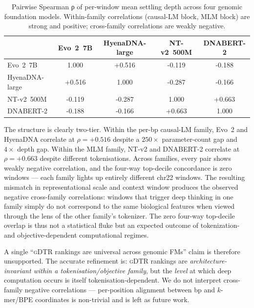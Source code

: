 \documentclass[12pt]{article}
\renewenvironment{table*}{\begin{table}}{\end{table}}
\theoremstyle{plain}
\theoremstyle{definition}
\theoremstyle{remark}
\newcommand{\gDTR}{\textsc{gDTR}}
\begin{document}
\begin{table}[t]
\caption{Pairwise Spearman ρ of per-window mean settling depth
across four genomic foundation models. Within-family correlations
(causal-LM block, MLM block) are strong and positive; cross-family
correlations are weakly negative.}
\label{tab:cross-arch}
\centering
\small
\begin{tabular}{@{}lcccc@{}}
\toprule
 & Evo~2~7B & HyenaDNA-large & NT-v2~500M & DNABERT-2 \\
\midrule
Evo~2~7B         & 1.000 & +0.516 & -0.119 & -0.188 \\
HyenaDNA-large   & +0.516 & 1.000 & -0.287 & -0.166 \\
NT-v2~500M       & -0.119 & -0.287 & 1.000 & +0.663 \\
DNABERT-2        & -0.188 & -0.166 & +0.663 & 1.000 \\
\bottomrule
\end{tabular}
\end{table}

The structure is clearly two-tier. Within the per-bp causal-LM family,
Evo~2 and HyenaDNA correlate at $\rho=+0.516$ despite a $250\times$
parameter-count gap and $4\times$ depth gap. Within the MLM family,
NT-v2 and DNABERT-2 correlate at $\rho=+0.663$ despite different
tokenisations. Across families, every pair shows weakly negative
correlation, and the four-way top-decile concordance is zero windows
--- each family lights up entirely different chr22 windows. The
resulting mismatch in representational scale and context window
produces the observed negative cross-family correlations: windows that
trigger deep thinking in one family simply do not correspond to the
same biological features when viewed through the lens of the other
family's tokenizer. The zero four-way top-decile overlap is thus not a
statistical fluke but an expected outcome of tokenization- and
objective-dependent computational regimes.

A single ``\gDTR{} rankings are universal across genomic FMs'' claim
is therefore unsupported. The accurate refinement is: \gDTR{} rankings
are \emph{architecture-invariant within a tokenisation/objective
family}, but the \emph{level} at which deep computation occurs is
itself tokenisation-dependent. We do not interpret cross-family
negative correlations --- per-position alignment between bp and
$k$-mer/BPE coordinates is non-trivial and is left as future work.
\end{document}
